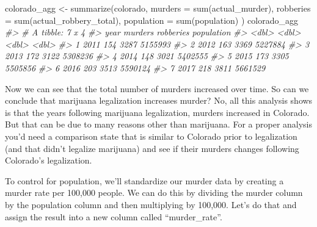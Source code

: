 \documentclass[
]{krantz}
\makeatletter
\newenvironment{Shaded}{\begin{snugshade}}{\end{snugshade}}
\newcommand{\AttributeTok}[1]{\textcolor[rgb]{0.61,0.61,0.61}{#1}}
\newcommand{\CommentTok}[1]{\textcolor[rgb]{0.37,0.37,0.37}{\textit{#1}}}
\newcommand{\DecValTok}[1]{\textcolor[rgb]{0.06,0.06,0.06}{#1}}
\newcommand{\FunctionTok}[1]{\textcolor[rgb]{0,0,0}{#1}}
\newcommand{\NormalTok}[1]{#1}
\newcommand{\OtherTok}[1]{\textcolor[rgb]{0.37,0.37,0.37}{#1}}
\newcommand{\SpecialCharTok}[1]{\textcolor[rgb]{0,0,0}{#1}}
\newenvironment{kframe}{%
\medskip{}
\setlength{\fboxsep}{.8em}
 \def\at@end@of@kframe{}%
 \ifinner\ifhmode%
  \def\at@end@of@kframe{\end{minipage}}%
  \begin{minipage}{\columnwidth}%
 \fi\fi%
 \def\FrameCommand##1{\hskip\@totalleftmargin \hskip-\fboxsep
 \colorbox{shadecolor}{##1}\hskip-\fboxsep
     \hskip-\linewidth \hskip-\@totalleftmargin \hskip\columnwidth}%
 \MakeFramed {\advance\hsize-\width
   \@totalleftmargin\z@ \linewidth\hsize
   \@setminipage}}%
 {\par\unskip\endMakeFramed%
 \at@end@of@kframe}
\renewenvironment{Shaded}{\begin{kframe}}{\end{kframe}}
\makeatother
\begin{document}
\begin{Shaded}
\begin{Highlighting}[]
\NormalTok{colorado\_agg }\OtherTok{\textless{}{-}} \FunctionTok{summarize}\NormalTok{(colorado,}
  \AttributeTok{murders    =} \FunctionTok{sum}\NormalTok{(actual\_murder),}
  \AttributeTok{robberies  =} \FunctionTok{sum}\NormalTok{(actual\_robbery\_total),}
  \AttributeTok{population =} \FunctionTok{sum}\NormalTok{(population)}
\NormalTok{)}
\NormalTok{colorado\_agg}
\CommentTok{\#\textgreater{} \# A tibble: 7 x 4}
\CommentTok{\#\textgreater{}    year murders robberies population}
\CommentTok{\#\textgreater{}   \textless{}dbl\textgreater{}   \textless{}dbl\textgreater{}     \textless{}dbl\textgreater{}      \textless{}dbl\textgreater{}}
\CommentTok{\#\textgreater{} 1  2011     154      3287    5155993}
\CommentTok{\#\textgreater{} 2  2012     163      3369    5227884}
\CommentTok{\#\textgreater{} 3  2013     172      3122    5308236}
\CommentTok{\#\textgreater{} 4  2014     148      3021    5402555}
\CommentTok{\#\textgreater{} 5  2015     173      3305    5505856}
\CommentTok{\#\textgreater{} 6  2016     203      3513    5590124}
\CommentTok{\#\textgreater{} 7  2017     218      3811    5661529}
\end{Highlighting}
\end{Shaded}

Now we can see that the total number of murders increased
over time. So can we conclude that marijuana legalization
increases murder? No, all this analysis shows is that the
years following marijuana legalization, murders increased in
Colorado. But that can be due to many reasons other than
marijuana. For a proper analysis you'd need a comparison
state that is similar to Colorado prior to legalization (and
that didn't legalize marijuana) and see if their murders
changes following Colorado's legalization.

To control for population, we'll standardize our murder data
by creating a murder rate per 100,000 people. We can do this
by dividing the murder column by the population column and
then multiplying by 100,000. Let's do that and assign the
result into a new column called ``murder\_rate''.

\begin{Shaded}
\end{Shaded}
\end{document}
